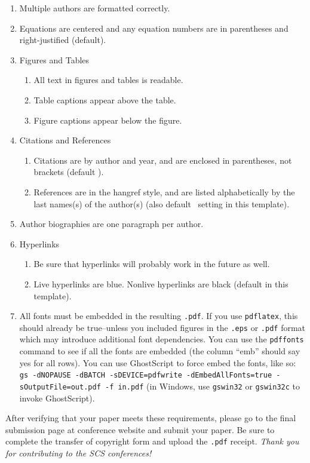 \documentclass{scspaperproc}
\theoremstyle{scsthe}
\begin{document}
\begin{enumerate}
	\item Multiple authors are formatted correctly.
	\item Equations are centered and any equation numbers are in parentheses and right-justified (default).
	\item Figures and Tables
  \begin{enumerate}
	  \item All text in figures and tables is readable.
	  \item Table captions appear above the table.
	  \item Figure captions appear below the figure.
	\end{enumerate}
	\item Citations and References
  \begin{enumerate}
	  \item Citations are by author and year, and are enclosed in parentheses, not brackets (default \BibTeX). 
	  \item References are in the hangref style, and are listed alphabetically by the last names(s) of the author(s) (also default \BibTeX\ setting in this template). 
	\end{enumerate}
	\item Author biographies are one paragraph per author.
	\item Hyperlinks
  \begin{enumerate}
	  \item Be sure that hyperlinks will probably work in the future as well.
	  \item Live hyperlinks are blue. Nonlive hyperlinks are black (default in this template).
	\end{enumerate}
	\item All fonts must be embedded in the resulting \texttt{.pdf}. If you use \texttt{pdflatex}, this should already be true--unless you included figures in the \texttt{.eps} or \texttt{.pdf} format which may introduce additional font dependencies. You can use the \texttt{pdffonts} command to see if all the fonts are embedded (the column ``emb'' should say yes for all rows). You can use GhostScript to force embed the fonts, like so: {\texttt{gs -dNOPAUSE -dBATCH -sDEVICE=pdfwrite -dEmbedAllFonts=true -sOutputFile=out.pdf -f in.pdf}} (in Windows, use \texttt{gswin32} or \texttt{gswin32c} to invoke GhostScript).
\end{enumerate}

After verifying that your paper meets these requirements, please go to the final submission page at conference website and submit your paper. Be sure to complete the transfer of copyright form and upload the \texttt{.pdf} receipt. \textit{Thank you for contributing to the SCS conferences!}
\end{document}
